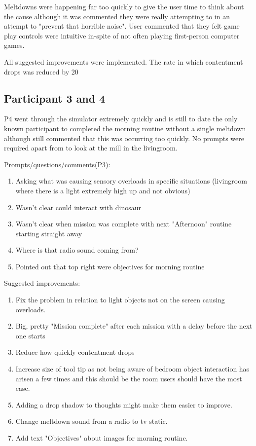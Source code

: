 \documentclass[11pt]{report}
\begin{document}
Meltdowns were happening far too quickly to give the user time to think about the cause although it was commented they were really attempting to in an attempt to "prevent that horrible noise". User commented that they felt game play controls were intuitive in-spite of not often playing first-person computer games. 

All suggested improvements were implemented. The rate in which contentment drops was reduced by 20%

\subsection*{Participant 3 and 4}
P4 went through the simulator extremely quickly and is still to date the only known participant to completed the morning routine without a single meltdown although still commented that this was occurring too quickly. No prompts were required apart from to look at the mill in the livingroom. 

Prompts/questions/comments(P3):
\begin{enumerate}
\item Asking what was causing sensory overloads in specific situations (livingroom where there is a light extremely high up and not obvious)
\item Wasn't clear could interact with dinosaur
\item Wasn't clear when mission was complete with next "Afternoon" routine starting straight away
\item Where is that radio sound coming from?
\item Pointed out that top right were objectives for morning routine
\end{enumerate}

Suggested improvements:
\begin{enumerate}
\item Fix the problem in relation to light objects not on the screen causing overloads.
\item Big, pretty "Mission complete" after each mission with a delay before the next one starts
\item Reduce how quickly contentment drops
\item Increase size of tool tip as not being aware of bedroom object interaction has arisen a few times and this should be the room users should have the most ease. 
\item Adding a drop shadow to thoughts might make them easier to improve.
\item Change meltdown sound from a radio to tv static. 
\item Add text "Objectives" about images for morning routine. 
\end{enumerate}
\end{document}

